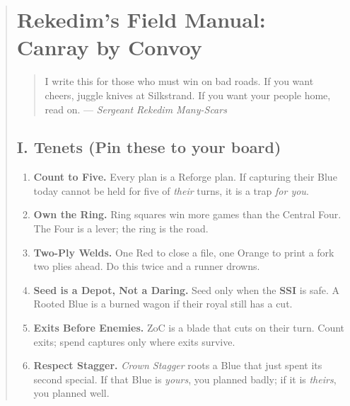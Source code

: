 \documentclass[11pt]{article}
\begin{document}
\begin{quote}
\section{Rekedim’s Field Manual: Canray by Convoy}
\label{sec:rekedim-manual}

\begin{quote}\small
I write this for those who must win on bad roads. If you want cheers, juggle knives at Silkstrand. If you want your people home, read on. — \textit{Sergeant Rekedim Many-Scars}
\end{quote}

\subsection{I. Tenets (Pin these to your board)}
\begin{enumerate}\itemsep0.25em
  \item \textbf{Count to Five.} Every plan is a Reforge plan. If capturing their Blue today cannot be held for five of \emph{their} turns, it is a trap \emph{for you}.
  \item \textbf{Own the Ring.} Ring squares win more games than the Central Four. The Four is a lever; the ring is the road.
  \item \textbf{Two-Ply Welds.} One Red to close a file, one Orange to print a fork two plies ahead. Do this twice and a runner drowns.
  \item \textbf{Seed is a Depot, Not a Daring.} Seed only when the \textbf{SSI} is safe. A Rooted Blue is a burned wagon if their royal still has a cut.
  \item \textbf{Exits Before Enemies.} ZoC is a blade that cuts on their turn. Count exits; spend captures only where exits survive.
  \item \textbf{Respect Stagger.} \emph{Crown Stagger} roots a Blue that just spent its second special. If that Blue is \emph{yours}, you planned badly; if it is \emph{theirs}, you planned well.
\end{enumerate}


\end{quote}
\end{document}
